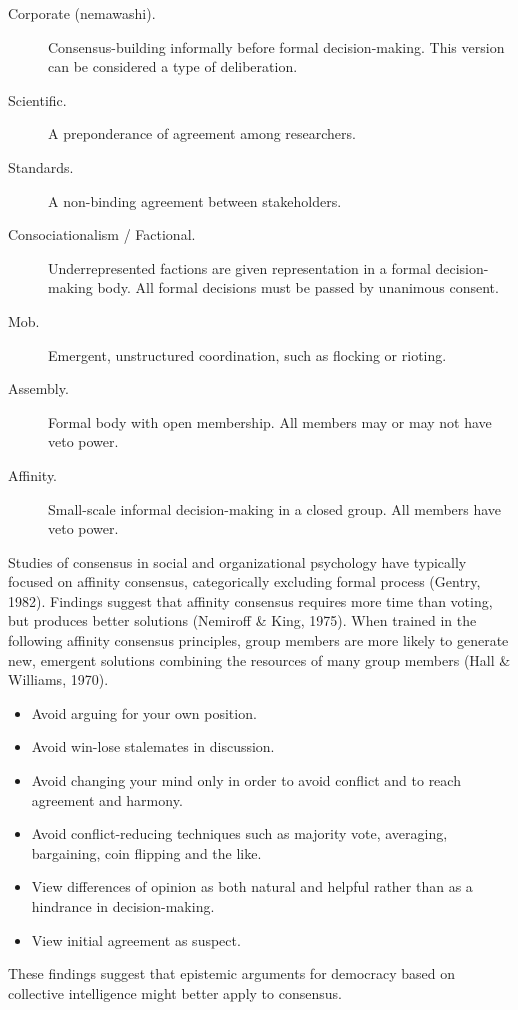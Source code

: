 \begin{description}
\item[Corporate (nemawashi).]{Consensus-building informally before formal decision-making. This version can be considered a type of deliberation.}
\item[Scientific.]{A preponderance of agreement among researchers.}
\item[Standards.]{A non-binding agreement between stakeholders.}
\item[Consociationalism / Factional.]{Underrepresented factions are given representation in a formal decision-making body. All formal decisions must be passed by unanimous consent.}
\item[Mob.]{Emergent, unstructured coordination, such as flocking or rioting.}
\item[Assembly.]{Formal body with open membership. All members may or may not have veto power.}
\item[Affinity.]{Small-scale informal decision-making in a closed group. All members have veto power.}
\end{description}

Studies of consensus in social and organizational psychology have typically focused on affinity consensus, categorically excluding formal process (Gentry, 1982). Findings suggest that affinity consensus requires more time than voting, but produces better solutions (Nemiroff \& King, 1975). When trained in the following affinity consensus principles, group members are more likely to generate new, emergent solutions combining the resources of many group members (Hall \& Williams, 1970). 
\begin{itemize}
\item{Avoid arguing for your own position.}
\item{Avoid win-lose stalemates in discussion.}
\item{Avoid changing your mind only in order to avoid conflict and to reach agreement and harmony.}
\item{Avoid conflict-reducing techniques such as majority vote, averaging, bargaining, coin flipping and the like.}
\item{View differences of opinion as both natural and helpful rather than as a hindrance in decision-making.}
\item{View initial agreement as suspect.}
\end{itemize}
These findings suggest that epistemic arguments for democracy based on collective intelligence might better apply to consensus.

